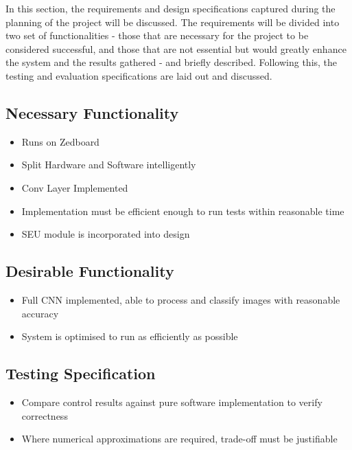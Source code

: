 \documentclass[12pt]{article}
\begin{document}
In this section, the requirements and design specifications captured during the planning of the project will be discussed. The requirements will be divided into two set of functionalities - those that are necessary for the project to be considered successful, and those that are not essential but would greatly enhance the system and the results gathered - and briefly described. Following this, the testing and evaluation specifications are laid out and discussed.

\subsection{Necessary Functionality}
\label{sec:ProjSpec-Necessary}


\begin{itemize}
\item Runs on Zedboard
\item Split Hardware and Software intelligently
\item Conv Layer Implemented
\item Implementation must be efficient enough to run tests within reasonable time
\item SEU module is incorporated into design
\end{itemize}

\subsection{Desirable Functionality}
\label{sec:ProjSpec-Desirable}


\begin{itemize}
\item Full CNN implemented, able to process and classify images with reasonable accuracy
\item System is optimised to run as efficiently as possible
\end{itemize}

\subsection{Testing Specification}
\label{sec:ProjSpec-TestSpec}


\begin{itemize}
\item Compare control results against pure software implementation to verify correctness
\item Where numerical approximations are required, trade-off must be justifiable
\end{itemize}
\end{document}
